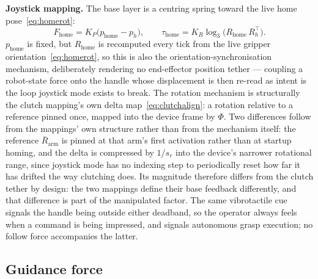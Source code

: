 \documentclass[12pt,a4paper,twoside,openright]{report}
\begin{document}
\textbf{Joystick mapping.} The base layer is a centring spring toward the live home pose~\eqref{eq:homerot}:
\begin{equation}
F_{\text{home}} = K_P\bigl(p_{\text{home}} - p_h\bigr),
\qquad
\tau_{\text{home}} = K_R \log_3\!\bigl(R_{\text{home}}\,R_h^{\top}\bigr).
\label{eq:fhome}
\end{equation}
$p_{\text{home}}$ is fixed, but $R_{\text{home}}$ is recomputed every tick from the live gripper orientation~\eqref{eq:homerot}, so this is also the orientation-synchronisation mechanism, deliberately rendering no end-effector position tether --- coupling a robot-state force onto the handle whose displacement is then re-read as intent is the loop joystick mode exists to break. The rotation mechanism is structurally the clutch mapping's own delta map~\eqref{eq:clutchalign}: a rotation relative to a reference pinned once, mapped into the device frame by $\Phi$. Two differences follow from the mappings' own structure rather than from the mechanism itself: the reference $\bar{R}_{\text{arm}}$ is pinned at that arm's first activation rather than at startup homing, and the delta is compressed by $1/s_r$ into the device's narrower rotational range, since joystick mode has no indexing step to periodically reset how far it has drifted the way clutching does. Its magnitude therefore differs from the clutch tether by design: the two mappings define their base feedback differently, and that difference is part of the manipulated factor. The same vibrotactile cue signals the handle being outside either deadband, so the operator always feels when a command is being impressed, and signals autonomous grasp execution; no follow force accompanies the latter.

\subsection{Guidance force}
\label{sec:guidance}
\end{document}
